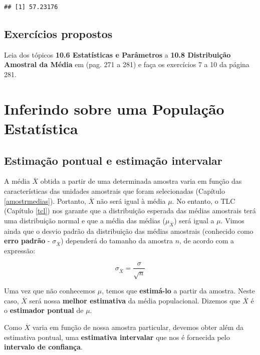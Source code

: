 \documentclass[
]{book}
\begin{document}
\begin{verbatim}
## [1] 57.23176
\end{verbatim}

\hypertarget{exercuxedcios-propostos-1}{%
\section{Exercícios propostos}\label{exercuxedcios-propostos-1}}

Leia dos tópicos \textbf{10.6 Estatísticas e Parâmetros} a \textbf{10.8 Distribuição Amostral da Média} em \citep{bussabemoretin6a} (pag. 271 a 281) e faça os exercícios 7 a 10 da página 281.

\hypertarget{inferenc}{%
\chapter{Inferindo sobre uma População Estatística}\label{inferenc}}

\hypertarget{estimauxe7uxe3o-pontual-e-estimauxe7uxe3o-intervalar}{%
\section{Estimação pontual e estimação intervalar}\label{estimauxe7uxe3o-pontual-e-estimauxe7uxe3o-intervalar}}

A média \(\overline{X}\) obtida a partir de uma determinada amostra varia em função das características das unidades amostrais que foram selecionadas (Capítulo \ref{amostrmedias}). Portanto, \(\overline{X}\) não será igual à média \(\mu\). No entanto, o TLC (Capítulo \ref{tcl}) nos garante que a distribuição esperada das médias amostrais terá uma distribuição normal e que a média das médias (\(\mu_{\overline{X}}\)) será igual a \(\mu\). Vimos ainda que o desvio padrão da distribuição das médias amostrais (conhecido como \textbf{erro padrão} - \(\sigma_{\overline{X}}\)) dependerá do tamanho da amostra \(n\), de acordo com a expressão:

\[\sigma_{\overline{X}} = \frac{\sigma}{\sqrt{n}}\]

Uma vez que não conhecemos \(\mu\), temos que \textbf{estimá-lo} a partir da amostra. Neste caso, \(\overline{X}\) será nossa \textbf{melhor estimativa} da média populacional. Dizemos que \(\overline{X}\) é o \textbf{estimador pontual} de \(\mu\).

Como \(\overline{X}\) varia em função de nossa amostra particular, devemos obter além da estimativa pontual, uma \textbf{estimativa intervalar} que nos é fornecida pelo \textbf{intervalo de confiança}.
\end{document}
